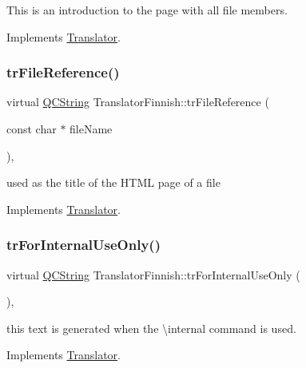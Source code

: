 This is an introduction to the page with all file members. 

Implements \mbox{\hyperlink{class_translator}{Translator}}.

\mbox{\label{class_translator_finnish_a22309fc877c5fa392185303e376c10bf}} 
\subsubsection{\texorpdfstring{trFileReference()}{trFileReference()}}
{\footnotesize\ttfamily virtual \mbox{\hyperlink{class_q_c_string}{Q\+C\+String}} Translator\+Finnish\+::tr\+File\+Reference (\begin{DoxyParamCaption}\item[{const char $\ast$}]{file\+Name }\end{DoxyParamCaption})\hspace{0.3cm}{\ttfamily [inline]}, {\ttfamily [virtual]}}

used as the title of the H\+T\+ML page of a file 

Implements \mbox{\hyperlink{class_translator}{Translator}}.

\mbox{\label{class_translator_finnish_aba508677b46afb45bbd46f9df1eb0cf0}} 
\subsubsection{\texorpdfstring{trForInternalUseOnly()}{trForInternalUseOnly()}}
{\footnotesize\ttfamily virtual \mbox{\hyperlink{class_q_c_string}{Q\+C\+String}} Translator\+Finnish\+::tr\+For\+Internal\+Use\+Only (\begin{DoxyParamCaption}{ }\end{DoxyParamCaption})\hspace{0.3cm}{\ttfamily [inline]}, {\ttfamily [virtual]}}

this text is generated when the \textbackslash{}internal command is used. 

Implements \mbox{\hyperlink{class_translator}{Translator}}.

\mbox{\label{class_translator_finnish_aff6995c927817d6ff10d96b0cb810ee6}} 
